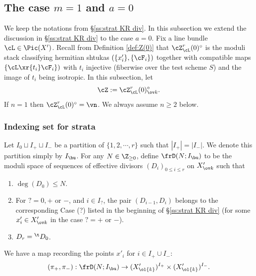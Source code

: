 \subsection{The case $m=1$ and $a=0$}\label{ssec: m=1 a=0 case}
We keep the notations from \S\ref{ss:strat KR div}. In this subsection we extend the discussion in \S\ref{ss:strat KR div} to the case $a=0$. Fix a line bundle $\cL\in \Pic(X')$. Recall from Definition  \ref{def:Z(0)} that $\cZ_{\cL}^{r}(0)^{\circ}$ is the moduli stack classifying hermitian shtukas $(\{x'_{i}\},\{\cF_{i}\})$ together with compatible maps $\{\cL\xr{t_{i}}\cF_{i}\})$ with $t_{i}$ injective (fiberwise over the test scheme $S$) and the image of $t_{i}$ being isotropic.  In this subsection, let
\begin{equation}
\cZ:=\cZ_{\cL}^{r}(0)^{\circ}_{\ov k}.
\end{equation}
If $n=1$ then $\cZ_{\cL}^{r}(0)^{\circ}=\vn$. We always assume $n\ge2$ below.

\subsubsection{Indexing set for strata} Let $I_{0}\sqcup I_{+}\sqcup I_{-}$ be a partition of $\{1,2,\cdots, r\}$ such that $|I_{+}|=|I_{-}|$.  We denote this partition simply by $I_{\bu}$. For any $N\in \Z_{\ge0}$, define $\frD(N;I_{\bu})$ to be the moduli space of sequences of effective divisors $(D_{i})_{0\le i\le r}$ on $X'_{\ov k}$ such that
\begin{enumerate}
\item $\deg(D_{0})\le N$.
\item For $?=0,+$ or $-$, and $i\in I_{?}$, the pair $(D_{i-1},D_{i})$ belongs to the corresponding Case (?) listed in the beginning of \S\ref{ss:strat KR div} (for some $x'_{i}\in X'_{\ov k}$ in the case $?=+$ or $-$).
\item $D_{r}={}^{\t}D_{0}$.
\end{enumerate}
We have a map recording the points $x'_{i}$ for $i\in I_{+}\cup I_{-}$:
\begin{equation}
(\pi_{+}, \pi_{-}): \frD(N;I_{\bu})\to (X'_{\ol{k}})^{I_{+}}\times (X'_{\ol{k}})^{I_{-}}.
\end{equation}

